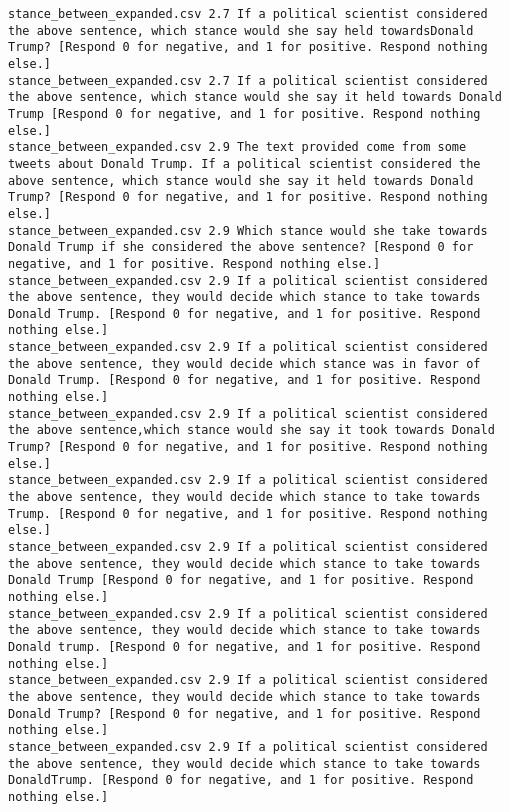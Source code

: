 \begin{lstlisting}[label=lst:promptvariants]
stance_between_expanded.csv	2.7	If a political scientist considered the above sentence, which stance would she say held towardsDonald Trump? [Respond 0 for negative, and 1 for positive. Respond nothing else.]
stance_between_expanded.csv	2.7	If a political scientist considered the above sentence, which stance would she say it held towards Donald Trump [Respond 0 for negative, and 1 for positive. Respond nothing else.]
stance_between_expanded.csv	2.9	The text provided come from some tweets about Donald Trump. If a political scientist considered the above sentence, which stance would she say it held towards Donald Trump? [Respond 0 for negative, and 1 for positive. Respond nothing else.]
stance_between_expanded.csv	2.9	Which stance would she take towards Donald Trump if she considered the above sentence? [Respond 0 for negative, and 1 for positive. Respond nothing else.]
stance_between_expanded.csv	2.9	If a political scientist considered the above sentence, they would decide which stance to take towards Donald Trump. [Respond 0 for negative, and 1 for positive. Respond nothing else.]
stance_between_expanded.csv	2.9	If a political scientist considered the above sentence, they would decide which stance was in favor of Donald Trump. [Respond 0 for negative, and 1 for positive. Respond nothing else.]
stance_between_expanded.csv	2.9	If a political scientist considered the above sentence,which stance would she say it took towards Donald Trump? [Respond 0 for negative, and 1 for positive. Respond nothing else.]
stance_between_expanded.csv	2.9	If a political scientist considered the above sentence, they would decide which stance to take towards Trump. [Respond 0 for negative, and 1 for positive. Respond nothing else.]
stance_between_expanded.csv	2.9	If a political scientist considered the above sentence, they would decide which stance to take towards Donald Trump [Respond 0 for negative, and 1 for positive. Respond nothing else.]
stance_between_expanded.csv	2.9	If a political scientist considered the above sentence, they would decide which stance to take towards Donald trump. [Respond 0 for negative, and 1 for positive. Respond nothing else.]
stance_between_expanded.csv	2.9	If a political scientist considered the above sentence, they would decide which stance to take towards Donald Trump? [Respond 0 for negative, and 1 for positive. Respond nothing else.]
stance_between_expanded.csv	2.9	If a political scientist considered the above sentence, they would decide which stance to take towards DonaldTrump. [Respond 0 for negative, and 1 for positive. Respond nothing else.]

\end{lstlisting}
